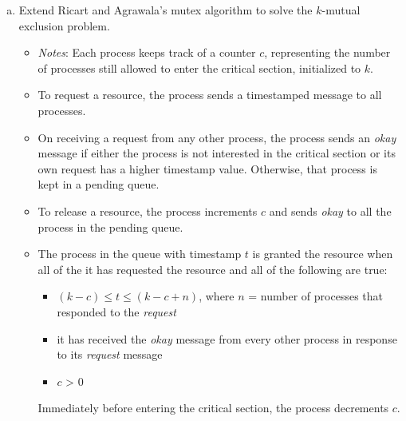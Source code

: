\documentclass[11pt]{article}
\newcounter{problem}
\begin{document}
\begin{enumerate}
\begin{enumerate}[(a)]
\item Extend Ricart and Agrawala's mutex algorithm to solve the $k$-mutual exclusion problem.

\begin{itemize}                                                 
\item \emph{Notes}: Each process keeps track of a counter $c$, representing the number of processes still allowed to enter the critical section, initialized to $k$.
\item To request a resource, the process sends a timestamped message to all processes.
\item On receiving a request from any other process, the process sends an \emph{okay} message if either the process is not interested in the critical section or its own request has a higher timestamp value. Otherwise, that process is kept in a pending queue.
\item To release a resource, the process increments $c$ and sends \emph{okay} to all the process in the pending queue.
\item The process in the queue with timestamp $t$ is granted the resource when all of the it has requested the resource and all of the following are true:
\begin{itemize}                                                 
\item $(k-c)\leq t \leq(k-c+n)$, where $n$ = number of processes that responded to the \emph{request}
\item it has received the \emph{okay} message from every other process in response to its \emph{request} message
\item $c$ > 0                                                   
\end{itemize}                                                   
Immediately before entering the critical section, the process decrements $c$.
\end{itemize}                                                   

\end{enumerate}                                                 
\end{enumerate}                                                 
\end{document}
